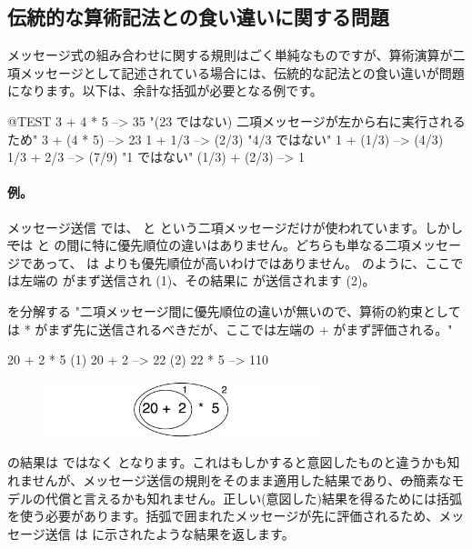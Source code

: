 \documentclass[a4paper,10pt,twoside]{book}
\begin{document}
\subsection{伝統的な算術記法との食い違いに関する問題}
メッセージ式の組み合わせに関する規則はごく単純なものですが、算術演算が二項メッセージとして記述されている場合には、伝統的な記法との食い違いが問題になります。以下は、余計な括弧が必要となる例です。

\begin{code}{@TEST}
3 + 4 * 5      --> 35    "(23 ではない)  二項メッセージが左から右に実行されるため"
3 + (4 * 5)    --> 23
1 + 1/3         --> (2/3)    "4/3 ではない"
1 + (1/3)       --> (4/3)
1/3 + 2/3       --> (7/9)    "1 ではない"
(1/3) + (2/3)  --> 1
\end{code}

\paragraph{例。}
メッセージ送信  では、\ct{+} と \ct{*} という二項メッセージだけが使われています。しかし \st では \ct{+} と \ct{*} の間に特に優先順位の違いはありません。どちらも単なる二項メッセージであって、\ct{*} は \ct{+} よりも優先順位が高いわけではありません。 のように、ここでは左端の \ct{+} がまず送信され (1)、その結果に \ct{*} が送信されます (2)。

\begin{example}[binaryMessages1]{ を分解する}{}
"二項メッセージ間に優先順位の違いが無いので、算術の約束としては * がまず先に送信されるべきだが、ここでは左端の + がまず評価される。"

      20 + 2 * 5 
(1)  20 + 2 --> 22
(2)  22       * 5 --> 110
\end{example}

\begin{figure}
\begin{center}\includegraphics[width=8cm]{ucompoNoBracketPar}\end{center}
\end{figure}
\noindent
{}の結果は  ではなく  となります。これはもしかすると意図したものと違うかも知れませんが、メッセージ送信の規則をそのまま適用した結果であり、\st の簡素なモデルの代償と言えるかも知れません。正しい(意図した)結果を得るためには括弧を使う必要があります。括弧で囲まれたメッセージが先に評価されるため、メッセージ送信  は  に示されたような結果を返します。
\end{document}
